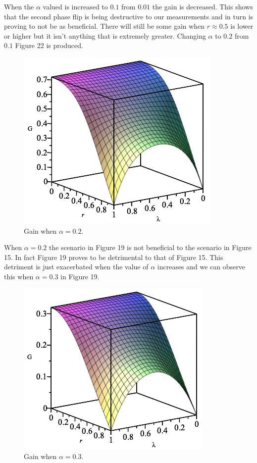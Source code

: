 \documentclass[twocolumn]{article}
\begin{document}
When the $\alpha$ valued is increased to $0.1$ from $0.01$ the gain is decreased. This shows that the second phase flip is being destructive to our measurements and in turn is proving to not be as beneficial. There will still be some gain when $r\approx0.5$ is lower or higher but it isn't anything that is extremely greater. Changing $\alpha$ to $0.2$ from $0.1$ Figure 22 is produced.
\begin{figure}[h]
\begin{center}
\includegraphics[width=0.65\linewidth]{Phase-Flip-Two-Channel-Alpha=02-Gain.png}
\caption{Gain when $\alpha=0.2$.}
\end{center}
\end{figure}
\newline
When $\alpha=0.2$ the scenario in Figure 19 is not beneficial to the scenario in Figure 15. In fact Figure 19 proves to be detrimental to that of Figure 15. This detriment is just exacerbated when the value of $\alpha$ increases and we can observe this when $\alpha=0.3$ in Figure 19.
\newpage
\begin{figure}[h]
\begin{center}
\includegraphics[width=0.65\linewidth]{Phase-Flip-Two-Channel-Alpha=03-Gain.png}
\caption{Gain when $\alpha=0.3$.}
\end{center}
\end{figure}
\end{document}

